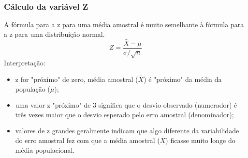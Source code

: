 \documentclass[11pt]{beamer}
\begin{document}
\begin{frame}
\frametitle{Cálculo da variável Z}
A fórmula para a z para uma média amostral é muito semelhante à fórmula para a z para uma distribuição normal. 
\[
Z = \frac{\bar{X} - \mu}{\sigma/\sqrt{n}}
\] 
Interpretação:
\begin{itemize}
\item z for "próximo" de zero, média amostral (\(\bar{X}\)) é "próximo" da média da população (\(\mu\)); 
\item uma valor z "próximo" de 3 significa que o desvio observado (numerador) é três vezes maior que o desvio esperado pelo erro amostral (denominador);
\item valores de z grandes geralmente indicam que algo diferente da variabilidade do erro amostral fez com que a média amostral (\(\bar{X}\)) ficasse muito longe do média populacional.
\end{itemize}

\end{frame}
\end{document}

